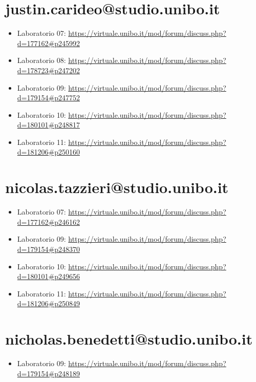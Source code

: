 \documentclass[a4paper,12pt]{report}
\begin{document}
\section{justin.carideo@studio.unibo.it}

\begin{itemize}
	\item Laboratorio 07: \url{https://virtuale.unibo.it/mod/forum/discuss.php?d=177162#p245992}
	\item Laboratorio 08: \url{https://virtuale.unibo.it/mod/forum/discuss.php?d=178723#p247202}
	\item Laboratorio 09: \url{https://virtuale.unibo.it/mod/forum/discuss.php?d=179154#p247752}
	\item Laboratorio 10: \url{https://virtuale.unibo.it/mod/forum/discuss.php?d=180101#p248817}
	\item Laboratorio 11: \url{https://virtuale.unibo.it/mod/forum/discuss.php?d=181206#p250160}
\end{itemize}

\section{nicolas.tazzieri@studio.unibo.it}

\begin{itemize}
	 \item Laboratorio 07: \url{https://virtuale.unibo.it/mod/forum/discuss.php?d=177162#p246162}
	 \item Laboratorio 09: \url{https://virtuale.unibo.it/mod/forum/discuss.php?d=179154#p248370}
	 \item Laboratorio 10: \url{https://virtuale.unibo.it/mod/forum/discuss.php?d=180101#p249656}
	 \item Laboratorio 11: \url{https://virtuale.unibo.it/mod/forum/discuss.php?d=181206#p250849}
\end{itemize}

\section{nicholas.benedetti@studio.unibo.it}

\begin{itemize}
    \item Laboratorio 09: \url{https://virtuale.unibo.it/mod/forum/discuss.php?d=179154#p248189}
\end{itemize}
\end{document}
